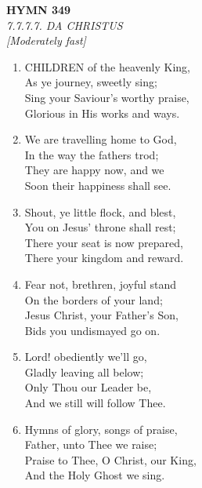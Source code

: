 \documentclass[11pt,a4paper]{article}
\begin{document}
\newpage
\begin{center}
    {\Large \textbf{HYMN 349}}
    \\
    \textit{7.7.7.7. DA CHRISTUS}
    \\
    \textit{\small [Moderately fast]}
\end{center}
\vspace{1em}

\begin{enumerate}
    \item CHILDREN of the heavenly King, \\
        As ye journey, sweetly sing; \\
        Sing your Saviour's worthy praise, \\
        Glorious in His works and ways.

    \item We are travelling home to God, \\
        In the way the fathers trod; \\
        They are happy now, and we \\
        Soon their happiness shall see.

    \item Shout, ye little flock, and blest, \\
        You on Jesus' throne shall rest; \\
        There your seat is now prepared, \\
        There your kingdom and reward.

    \item Fear not, brethren, joyful stand \\
        On the borders of your land; \\
        Jesus Christ, your Father's Son, \\
        Bids you undismayed go on.

    \item Lord! obediently we'll go, \\
        Gladly leaving all below; \\
        Only Thou our Leader be, \\
        And we still will follow Thee.

    \item Hymns of glory, songs of praise, \\
        Father, unto Thee we raise; \\
        Praise to Thee, O Christ, our King, \\
        And the Holy Ghost we sing.

\end{enumerate}
\end{document}
